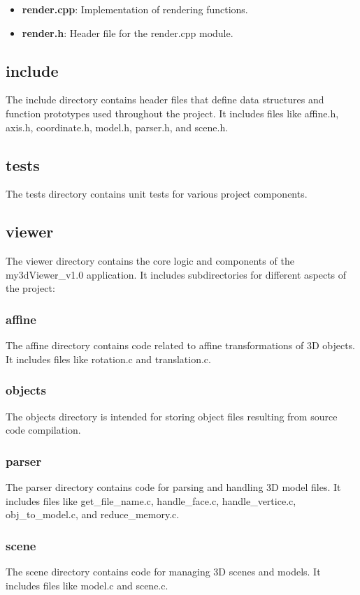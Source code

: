 \documentclass{article}
\begin{document}
\begin{itemize}
\item \textbf{render.cpp}: Implementation of rendering functions.
\item \textbf{render.h}: Header file for the render.cpp module.
\end{itemize}

\subsection{include}
The include directory contains header files that define data structures and function prototypes used throughout the project. It includes files like affine.h, axis.h, coordinate.h, model.h, parser.h, and scene.h.

\subsection{tests}
The tests directory contains unit tests for various project components.

\subsection{viewer}
The viewer directory contains the core logic and components of the my3dViewer\_v1.0 application. It includes subdirectories for different aspects of the project:

\subsubsection{affine}
The affine directory contains code related to affine transformations of 3D objects. It includes files like rotation.c and translation.c.

\subsubsection{objects}
The objects directory is intended for storing object files resulting from source code compilation.

\subsubsection{parser}
The parser directory contains code for parsing and handling 3D model files. It includes files like get\_file\_name.c, handle\_face.c, handle\_vertice.c, obj\_to\_model.c, and reduce\_memory.c.

\subsubsection{scene}
The scene directory contains code for managing 3D scenes and models. It includes files like model.c and scene.c.
\end{document}
